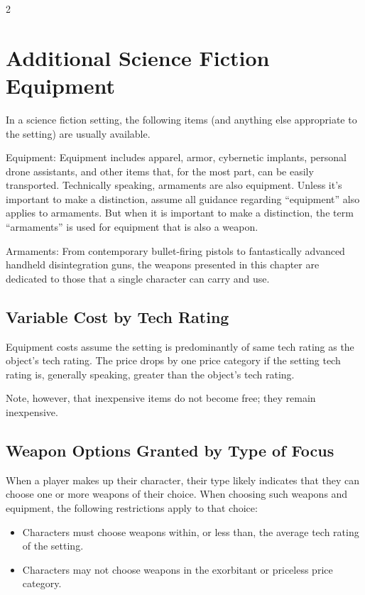 \begin{multicols}{2}

\chapter{Additional Science Fiction Equipment}

In a science fiction setting, the following items (and anything else appropriate to the setting) are usually available.

Equipment: Equipment includes apparel, armor, cybernetic implants, personal drone assistants, and other items that, for the most part, can be easily transported. Technically speaking, armaments are also equipment. Unless it’s important to make a distinction, assume all guidance regarding “equipment” also applies to armaments. But when it is important to make a distinction, the term “armaments” is used for equipment that is also a weapon.

Armaments: From contemporary bullet-firing pistols to fantastically advanced handheld disintegration guns, the weapons presented in this chapter are dedicated to those that a single character can carry and use.

\section{Variable Cost by Tech Rating}

Equipment costs assume the setting is predominantly of same tech rating as the object’s tech rating. The price drops by one price category if the setting tech rating is, generally speaking, greater than the object’s tech rating.

Note, however, that inexpensive items do not become free; they remain inexpensive.

\section{Weapon Options Granted by Type of Focus}

When a player makes up their character, their type likely indicates that they can choose one or more weapons of their choice. When choosing such weapons and equipment, the following restrictions apply to that choice:

\begin{itemize} 
\item Characters must choose weapons within, or less than, the average tech rating of the setting. 
\item Characters may not choose weapons in the exorbitant or priceless price category.
\end{itemize}


\end{multicols}
